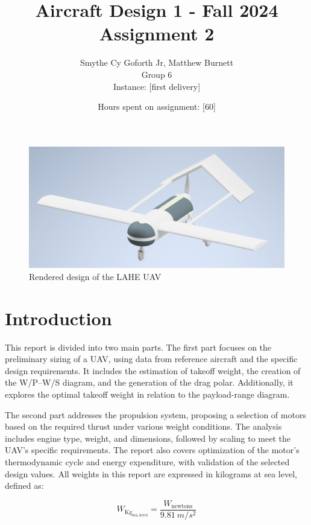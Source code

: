 \documentclass[12pt]{article}
\title{Aircraft Design 1 - Fall 2024 \\ Assignment 2}
\author{Smythe Cy Goforth Jr, Matthew Burnett \\ Group 6 \\ Instance: [first delivery]}
\date{Hours spent on assignment: [60]}
\begin{document}
	
	\maketitle
	\newpage
	
	
	\begin{figure}[h!]
		\centering
		\includegraphics[width=6 in]{Figures/Drone.png} %
		\caption{Rendered design of the LAHE UAV}
	\end{figure}
	
	\newpage
	
	\tableofcontents
	
	\newpage
	\section{Introduction}
	
	This report is divided into two main parts. The first part focuses on the preliminary sizing of a UAV, using data from reference aircraft and the specific design requirements. It includes the estimation of takeoff weight, the creation of the W/P–W/S diagram, and the generation of the drag polar. Additionally, it explores the optimal takeoff weight in relation to the payload-range diagram.
	
	The second part addresses the propulsion system, proposing a selection of motors based on the required thrust under various weight conditions. The analysis includes engine type, weight, and dimensions, followed by scaling to meet the UAV’s specific requirements. The report also covers optimization of the motor’s thermodynamic cycle and energy expenditure, with validation of the selected design values. All weights in this report are expressed in kilograms at sea level, defined as:
	
	\[
	W_{\text{Kg}_\text{sea level}} = \frac{W_{\text{newtons}}}{9.81~m/s^2}
	\]

		
\end{document}
